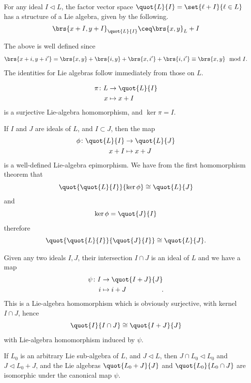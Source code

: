 \documentclass[10pt,a4paper,twoside,openany,hidelinks]{book}
\begin{document}
\begin{definition}
For any ideal $I \triangleleft L$, the factor vector space $\quot{L}{I} = \set{\ell + I}{\ell \in L}$ has a structure of a Lie algebra, given by the following.
\begin{align*}
\brs{x+I, y+I}_{\quot{L}{I}} \ceq \brs{x,y}_L + I
\end{align*}
\end{definition}
\begin{remark}
The above is well defined since
\[\brs{x+i, y+i'} = \brs{x,y} + \brs{i,y} + \brs{x,i'} + \brs{i,i'} \equiv \brs{x,y} \mod{I}\text{.}\]
The identities for Lie algebras follow immediately from those on $L$. 
\end{remark}
\begin{theorem}
\begin{align*}
\pi \colon L &\to \quot{L}{I} \\
x &\mapsto x+I
\end{align*}
is a surjective Lie-algebra homomorphism, and $\ker \pi = I$.
\end{theorem}
\begin{theorem}
If $I$ and $J$ are ideals of $L$, and $I \subset J$, then the map
\begin{align*}
\phi \colon \quot{L}{I} &\to \quot{L}{J} \\
x+I &\mapsto x+J 
\end{align*}
is a well-defined Lie-algebra epimorphism.
We have from the first homomorphism theorem that
\[\quot{\quot{L}{I}}{\ker \phi} \cong \quot{L}{J}\]
and
\[\ker \phi = \quot{J}{I}\]
therefore
\[\quot{\quot{L}{I}}{\quot{J}{I}} \cong \quot{L}{J}\text{.}\]
\end{theorem}
\begin{theorem}
Given any two ideals $I,J$, their intersection $I \cap J$ is an ideal of $L$ and we have a map
\begin{align*}
\psi \colon I &\to \quot{I+J}{J} \\
i &\mapsto i+J \phantom{\quot{}{J}}\text{.}
\end{align*}
This is a Lie-algebra homomorphism which is obviously surjective, with kernel $I \cap J$, hence
\[\quot{I}{I \cap J} \cong \quot{I+J}{J}\]
with Lie-algebra homomorphism induced by $\psi$.
\end{theorem}
\begin{remark}
If $L_0$ is an arbitrary Lie sub-algebra of $L$, and $J \triangleleft L$, then
$J \cap L_0 \triangleleft L_0$ and $J \triangleleft L_0 + J$, and the Lie algebras $\quot{L_0 + J}{J}$ and $\quot{L_0}{L_0 \cap J}$ are isomorphic under the canonical map $\psi$.
\end{remark}
\end{document}
